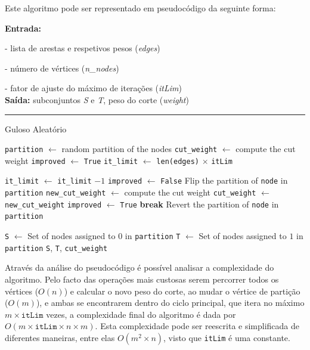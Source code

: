 \documentclass[mirror, portugues]{revdetua}
\begin{document}
Este algoritmo pode ser representado em pseudocódigo da seguinte forma:

\begin{algorithm}[H]
\raggedright
\textbf{Entrada:}

- lista de arestas e respetivos pesos (\textit{edges})

- número de vértices (\textit{n\_nodes})

- fator de ajuste do máximo de iterações (\textit{itLim})\\
\textbf{Saída:} subconjuntos \textit{S} e \textit{T}, peso do corte (\textit{weight}) \\
\hrule 
\caption{Guloso Aleatório}
\begin{algorithmic}[1]
    \State \texttt{partition} $\gets$ random partition of the nodes
    \State \texttt{cut\_weight} $\gets$ compute the cut weight
    \State \texttt{improved} $\gets$ \texttt{True}
    \State \texttt{it\_limit} $\gets$ \texttt{len(edges)} \ensuremath{\times} \texttt{itLim}

        \State \texttt{it\_limit} $\gets$ \texttt{it\_limit} $ - 1$
        \State \texttt{improved} $\gets$ \texttt{False}
            \State Flip the partition of \texttt{node} in \texttt{partition}
            \State \texttt{new\_cut\_weight} $\gets$ compute the cut weight
                \State \texttt{cut\_weight} $\gets$ \texttt{new\_cut\_weight}
                \State \texttt{improved} $\gets$ \texttt{True}
                \State \textbf{break}  
            \EndIf
            \State Revert the partition of \texttt{node} in \texttt{partition}
        \EndFor
    \EndWhile

    \State \texttt{S} $\gets$ Set of nodes assigned to $0$ in \texttt{partition}
    \State \texttt{T} $\gets$ Set of nodes assigned to $1$ in \texttt{partition}
    \Return \texttt{S}, \texttt{T}, \texttt{cut\_weight}
\end{algorithmic}
\end{algorithm}

Através da análise do pseudocódigo é possível analisar a complexidade do algoritmo. Pelo facto das operações mais custosas serem percorrer todos os vértices ($O(n)$) e calcular o novo peso do corte, ao mudar o vértice de partição ($O(m)$), e ambas se encontrarem dentro do ciclo principal, que itera no máximo $m \times \texttt{itLim}$ vezes, a complexidade final do algoritmo é dada por $O(m \times \texttt{itLim} \times n \times m)$. Esta complexidade pode ser reescrita e simplificada de diferentes maneiras, entre elas $O(m^2 \times n)$, visto que \texttt{itLim} é uma constante.
\end{document}
